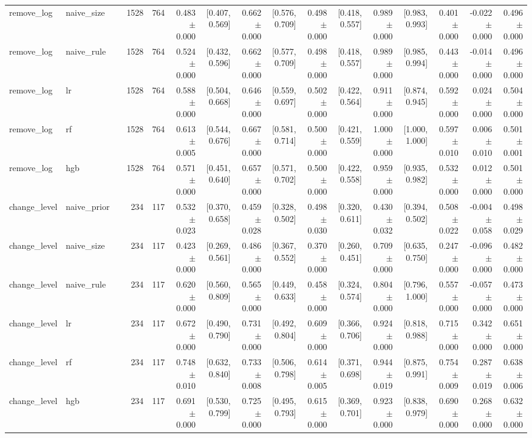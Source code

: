 \begin{table}[htbp]
{\begin{tabular}{llrrrrrrrrrrrrrr}
remove\_log & naive\_size &  & 1528 & 764 & 0.483 $\pm$ 0.000 & [0.407, 0.569] & 0.662 $\pm$ 0.000 & [0.576, 0.709] & 0.498 $\pm$ 0.000 & [0.418, 0.557] & 0.989 $\pm$ 0.000 & [0.983, 0.993] & 0.401 $\pm$ 0.000 & -0.022 $\pm$ 0.000 & 0.496 $\pm$ 0.000 \\
remove\_log & naive\_rule &  & 1528 & 764 & 0.524 $\pm$ 0.000 & [0.432, 0.596] & 0.662 $\pm$ 0.000 & [0.577, 0.709] & 0.498 $\pm$ 0.000 & [0.418, 0.557] & 0.989 $\pm$ 0.000 & [0.985, 0.994] & 0.443 $\pm$ 0.000 & -0.014 $\pm$ 0.000 & 0.496 $\pm$ 0.000 \\
remove\_log & lr &  & 1528 & 764 & 0.588 $\pm$ 0.000 & [0.504, 0.668] & 0.646 $\pm$ 0.000 & [0.559, 0.697] & 0.502 $\pm$ 0.000 & [0.422, 0.564] & 0.911 $\pm$ 0.000 & [0.874, 0.945] & 0.592 $\pm$ 0.000 & 0.024 $\pm$ 0.000 & 0.504 $\pm$ 0.000 \\
remove\_log & rf &  & 1528 & 764 & 0.613 $\pm$ 0.005 & [0.544, 0.676] & 0.667 $\pm$ 0.000 & [0.581, 0.714] & 0.500 $\pm$ 0.000 & [0.421, 0.559] & 1.000 $\pm$ 0.000 & [1.000, 1.000] & 0.597 $\pm$ 0.010 & 0.006 $\pm$ 0.010 & 0.501 $\pm$ 0.001 \\
remove\_log & hgb &  & 1528 & 764 & 0.571 $\pm$ 0.000 & [0.451, 0.640] & 0.657 $\pm$ 0.000 & [0.571, 0.702] & 0.500 $\pm$ 0.000 & [0.422, 0.558] & 0.959 $\pm$ 0.000 & [0.935, 0.982] & 0.532 $\pm$ 0.000 & 0.012 $\pm$ 0.000 & 0.501 $\pm$ 0.000 \\
change\_level & naive\_prior &  & 234 & 117 & 0.532 $\pm$ 0.023 & [0.370, 0.658] & 0.459 $\pm$ 0.028 & [0.328, 0.502] & 0.498 $\pm$ 0.030 & [0.320, 0.611] & 0.430 $\pm$ 0.032 & [0.394, 0.502] & 0.508 $\pm$ 0.022 & -0.004 $\pm$ 0.058 & 0.498 $\pm$ 0.029 \\
change\_level & naive\_size &  & 234 & 117 & 0.423 $\pm$ 0.000 & [0.269, 0.561] & 0.486 $\pm$ 0.000 & [0.367, 0.552] & 0.370 $\pm$ 0.000 & [0.260, 0.451] & 0.709 $\pm$ 0.000 & [0.635, 0.750] & 0.247 $\pm$ 0.000 & -0.096 $\pm$ 0.000 & 0.482 $\pm$ 0.000 \\
change\_level & naive\_rule &  & 234 & 117 & 0.620 $\pm$ 0.000 & [0.560, 0.809] & 0.565 $\pm$ 0.000 & [0.449, 0.633] & 0.458 $\pm$ 0.000 & [0.324, 0.574] & 0.804 $\pm$ 0.000 & [0.796, 1.000] & 0.557 $\pm$ 0.000 & -0.057 $\pm$ 0.000 & 0.473 $\pm$ 0.000 \\
change\_level & lr &  & 234 & 117 & 0.672 $\pm$ 0.000 & [0.490, 0.790] & 0.731 $\pm$ 0.000 & [0.492, 0.804] & 0.609 $\pm$ 0.000 & [0.366, 0.706] & 0.924 $\pm$ 0.000 & [0.818, 0.988] & 0.715 $\pm$ 0.000 & 0.342 $\pm$ 0.000 & 0.651 $\pm$ 0.000 \\
change\_level & rf &  & 234 & 117 & 0.748 $\pm$ 0.010 & [0.632, 0.840] & 0.733 $\pm$ 0.008 & [0.506, 0.798] & 0.614 $\pm$ 0.005 & [0.371, 0.698] & 0.944 $\pm$ 0.019 & [0.875, 0.991] & 0.754 $\pm$ 0.009 & 0.287 $\pm$ 0.019 & 0.638 $\pm$ 0.006 \\
change\_level & hgb &  & 234 & 117 & 0.691 $\pm$ 0.000 & [0.530, 0.799] & 0.725 $\pm$ 0.000 & [0.495, 0.793] & 0.615 $\pm$ 0.000 & [0.369, 0.701] & 0.923 $\pm$ 0.000 & [0.838, 0.979] & 0.690 $\pm$ 0.000 & 0.268 $\pm$ 0.000 & 0.632 $\pm$ 0.000 \\
\bottomrule
\end{tabular}}
\end{table}
